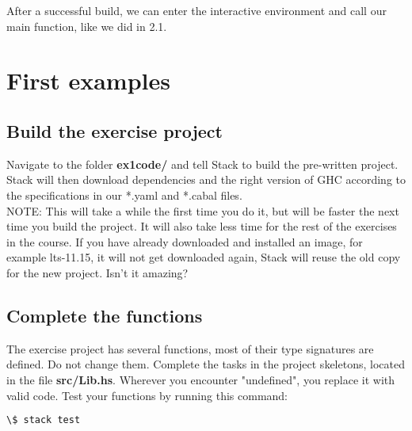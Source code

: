 \documentclass{article}
\begin{document}
After a successful build, we can enter the interactive environment and call our main function, like we did in 2.1.

\section{First examples}

\subsection{Build the exercise project}
Navigate to the folder \textbf{ex1code/} and tell Stack to build the pre-written project. Stack will then download dependencies and the right version of GHC according to the specifications in our *.yaml and *.cabal files.\\
NOTE: This will take a while the first time you do it, but will be faster the next time you build the project. It will also take less time for the rest of the exercises in the course. If you have already downloaded and installed an image, for example lts-11.15, it will not get downloaded again, Stack will reuse the old copy for the new project. Isn't it amazing?

\subsection{Complete the functions}
The exercise project has several functions, most of their type signatures are defined. Do not change them. Complete the tasks in the project skeletons, located in the file \textbf{src/Lib.hs}. Wherever you encounter "undefined", you replace it with valid code. Test your functions by running this command:
\begin{lstlisting}[language=bash]
  \$ stack test
\end{lstlisting}
\end{document}
